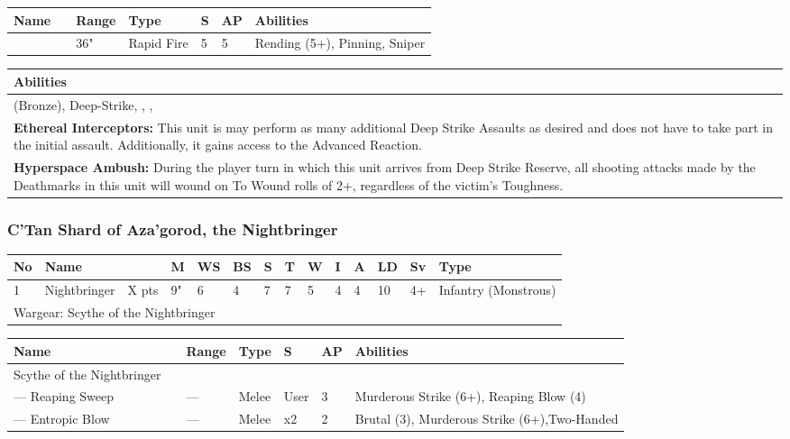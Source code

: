 \noindent
\begin{tabular}{||m{140pt} m{00pt} m{31pt} m{55pt} m{12pt} m{12pt} m{210pt}||}
	\hline
	Name & & Range & Type & S & AP & Abilities \\
	\hline
	\quickref{Synaptic Disintegrator} &  & 36" & Rapid Fire & 5 & 5 & Rending (5+), Pinning, Sniper \\
	\hline
\end{tabular}

\noindent
\begin{tabular}{||m{532pt}||}
	\hline
	Abilities \\
	\hline
	\quickref{Awakening Protocols} (Bronze), Deep-Strike, \quickref{Hyperspace Hunters}, \quickref{Living Metal}, \quickref{Reanimation Protocols} \\
	\textbf{Ethereal Interceptors:} This unit is may perform as many additional Deep Strike Assaults as desired and does not have to take part in the initial assault. Additionally, it gains access to the \quickref{Ethereal Interception} Advanced Reaction. \\
	\textbf{Hyperspace Ambush:} During the player turn in which this unit arrives from Deep Strike Reserve, all shooting attacks made by the Deathmarks in this unit will wound on To Wound rolls of 2+, regardless of the victim’s Toughness. \\
	\hline
\end{tabular}


\newpage
\subsubsection{C'Tan Shard of Aza'gorod, the Nightbringer}

\noindent
\begin{tabular}{||m{10pt} m{95pt} m{30pt} m{11pt} m{11pt} m{11pt} m{11pt} m{11pt} m{11pt} m{11pt} m{11pt} m{11pt} m{11pt} m{125pt}||}
	\hline
	No & Name & & M & WS & BS & S & T & W & I & A & LD & Sv & Type \\
	\hline
	1 & Nightbringer & X pts & 9" & 6 & 4 & 7 & 7 & 5 & 4 & 4 & 10 & 4+ & Infantry (Monstrous)\\
	\hline
	\hline
	\multicolumn{14}{||Z{532 pt}||}{Wargear: Scythe of the Nightbringer}\\
	\hline
\end{tabular}

\noindent
\begin{tabular}{||m{140pt} m{0pt} m{31pt} m{55pt} m{12pt} m{12pt} m{210pt}||}
	\hline
	Name & & Range & Type & S & AP & Abilities \\
	\hline
	Scythe of the Nightbringer & & & & & & \\
	— Reaping Sweep &  & — & Melee & User & 3 & Murderous Strike (6+), Reaping Blow (4) \\
	— Entropic Blow &  & — & Melee & x2 & 2 & Brutal (3), Murderous Strike (6+),Two-Handed \\
	\hline
\end{tabular}

